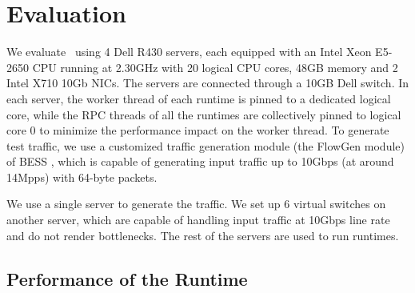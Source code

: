 \section{Evaluation}
\label{sec:experiments}


We evaluate \nfactor~using 4 Dell R430 servers, each equipped with an Intel Xeon E5-2650 CPU running at 2.30GHz with 20 logical CPU cores, 48GB memory and 2 Intel X710 10Gb NICs. The servers are connected through a 10GB Dell switch. In each server, the worker thread of each runtime is pinned to a dedicated logical core, while the RPC threads of all the runtimes are collectively pinned to logical core 0 to minimize the performance impact on the worker thread. To generate test traffic, we use a customized traffic generation module (the FlowGen module) of BESS \cite{bess}, which is capable of generating input traffic up to 10Gbps (at around 14Mpps) with 64-byte packets.

We use a single server to generate the traffic. We set up 6 virtual switches on another server, which are capable of handling input traffic at 10Gbps line rate and do not render bottlenecks. The rest of the servers are used to run runtimes.

\subsection{Performance of the Runtime}
\label{sec:micro-benchmark}

